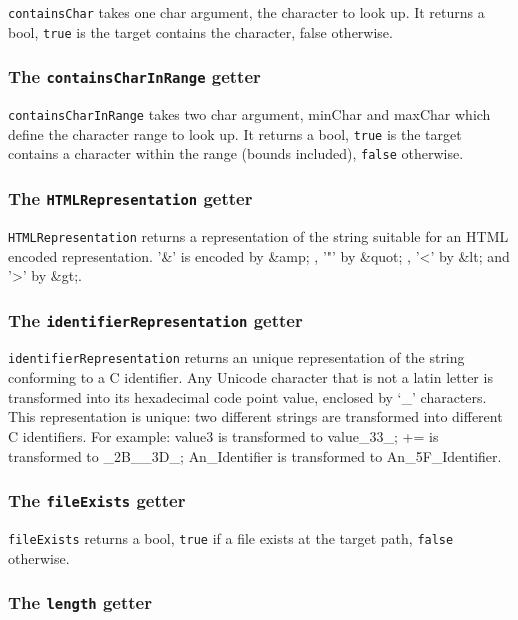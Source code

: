 \documentclass[10pt,openright,twosides]{report}
\newcommand{\character}[1]{{\small\ttfamily `{#1}'}}
\newcommand{\cdata}[1]{{\ttfamily #1}}
\newcommand{\ccst}[1]{{\footnotesize\ttfamily\colorbox{light-blue}{'#1'}}}
\newcommand{\gtlarg}[1]{{\footnotesize\ttfamily\colorbox{light-blue}{#1}}}
\newcommand{\gtlinline}[1]{\colorbox{light-blue}{\lstinline[language=gtl]{#1}}}
\begin{document}
\gtlinline{containsChar} takes one char argument, the \gtlarg{character} to look up. It returns a bool, \gtlinline{true} is the target contains the \gtlarg{character}, \gtlarg{false} otherwise.

\subsubsection{The \texttt{containsCharInRange} getter}

\gtlinline{containsCharInRange} takes two char argument, \gtlarg{minChar} and \gtlarg{maxChar} which define the character range to look up. It returns a bool, \texttt{true} is the target contains a character within the range (bounds included), \texttt{false} otherwise.

\subsubsection{The \texttt{HTMLRepresentation} getter}

\gtlinline{HTMLRepresentation} returns a representation of the string suitable for an HTML encoded representation. \ccst{\&} is encoded by \cdata{\&amp;} , \ccst{"} by \cdata{\&quot;} , \ccst{<} by \cdata{\&lt;} and \ccst{>} by \cdata{\&gt;}.


\subsubsection{The \texttt{identifierRepresentation} getter}

\gtlinline{identifierRepresentation} returns an unique representation of the string conforming to a C identifier. Any Unicode character that is not a latin letter is transformed into its hexadecimal code point value, enclosed by \character{_} characters. This representation is unique: two different strings are transformed into different C identifiers. For example: \cdata{value3} is transformed to \cdata{value_33_}; \cdata{+=} is transformed to \cdata{_2B__3D_};
\cdata{An_Identifier} is transformed to \cdata{An_5F_Identifier}.


\subsubsection{The \texttt{fileExists} getter}

\gtlinline{fileExists} returns a bool, \gtlinline{true} if a file exists at the target path, \gtlinline{false} otherwise.


\subsubsection{The \texttt{length} getter}
\end{document}
